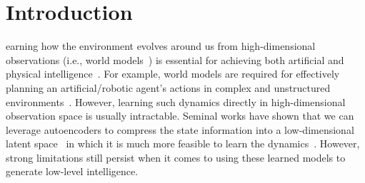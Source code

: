 \section{Introduction}
earning how the environment evolves around us from high-dimensional observations (i.e., world models~\citep{ha2018world}) is essential for achieving both artificial and physical intelligence~\citep{hafner2023mastering}.
For example, world models are required for effectively planning an artificial/robotic agent's actions in complex and unstructured environments~\citep{matsuo2022deep}. 
However, learning such dynamics directly in high-dimensional observation space is usually intractable. Seminal works have shown that we can leverage autoencoders to compress the state information into a low-dimensional latent space~\citep{liou2014autoencoder, kingma2014auto} in which it is much more feasible to learn the dynamics~\citep{watter2015embed, lenz2015deepmpc, wahlstrom2015learning, champion2019data, zhong2020unsupervised}.
%
However, strong limitations still persist when it comes to using these learned models to generate low-level intelligence.

